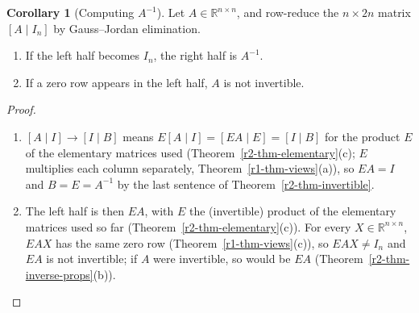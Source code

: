 \documentclass[12pt]{article}
\newcommand{\R}{\mathbb R}
\theoremstyle{definition}
\newtheorem{corollary}[theorem]{Corollary}
\begin{document}
\begin{corollary}[Computing \(A^{-1}\)]\label{r2-cor-computing-inverse}
Let \(A\in\R^{n\times n}\), and row-reduce the \(n\times2n\) matrix \([A\mid I_n]\) by Gauss--Jordan elimination.
\begin{enumerate}
\item If the left half becomes \(I_n\), the right half is \(A^{-1}\).
\item If a zero row appears in the left half, \(A\) is not invertible.
\end{enumerate}
\end{corollary}
\begin{proof}
\begin{enumerate}
\item \([A\mid I]\to[I\mid B]\) means \(E[A\mid I]=[EA\mid E]=[I\mid B]\) for the product \(E\) of
the elementary matrices used (Theorem~\ref{r2-thm-elementary}(c); \(E\) multiplies each column
separately, Theorem~\ref{r1-thm-views}(a)), so \(EA=I\) and \(B=E=A^{-1}\) by the last sentence of
Theorem~\ref{r2-thm-invertible}.
\item The left half is then
\(EA\), with \(E\) the (invertible) product of the elementary matrices used so far
(Theorem~\ref{r2-thm-elementary}(c)). For every \(X\in\R^{n\times n}\), \(EAX\) has the same zero
row (Theorem~\ref{r1-thm-views}(c)), so \(EAX\ne I_n\) and \(EA\) is not invertible; if \(A\) were
invertible, so would be \(EA\) (Theorem~\ref{r2-thm-inverse-props}(b)).\qedhere
\end{enumerate}
\end{proof}
\end{document}
